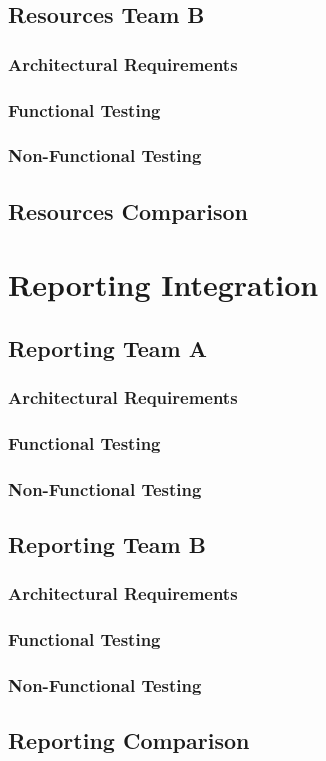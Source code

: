 \documentclass[12pt, oneside]{article}
\begin{document}
	\subsection{Resources Team B}	
		\subsubsection{Architectural Requirements}
			
		\subsubsection{Functional Testing}
			
		\subsubsection{Non-Functional Testing }
			
			
	
	\subsection{Resources Comparison}
	
\newpage 
\section{Reporting Integration}
	\subsection{Reporting Team A}	
		\subsubsection{Architectural Requirements}
			
		\subsubsection{Functional Testing}
			
		\subsubsection{Non-Functional Testing }
			
	
	\subsection{Reporting Team B}	
		\subsubsection{Architectural Requirements}
			
		\subsubsection{Functional Testing}
			
		\subsubsection{Non-Functional Testing }
			
	
	\subsection{Reporting Comparison}
\end{document}
